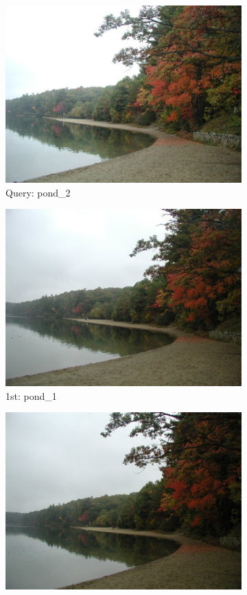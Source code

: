 \documentclass[10pt, a4paper]{article}
\begin{document}
\begin{itemize}
\begin{figure}[H]
	\centering
	\begin{subfigure}{0.25\textwidth}
	  \centering
	  \includegraphics[width=0.9\linewidth]{../input/pond_2.jpg}
	  \caption{Query: pond\_2}
	\end{subfigure}%
	\begin{subfigure}{0.25\textwidth}
	  \centering
	  \includegraphics[width=0.9\linewidth]{../input/pond_1.jpg}
	  \caption{1st: pond\_1}
	\end{subfigure}%
	\begin{subfigure}{0.25\textwidth}
        \centering
        \includegraphics[width=0.9\linewidth]{../input/pond_3.jpg}

\end{subfigure}
\end{figure}
\end{itemize}
\end{document}
